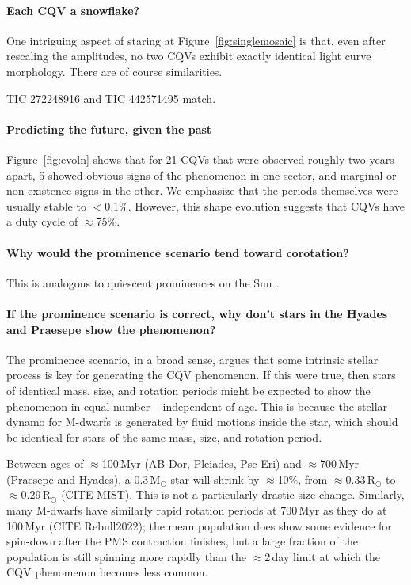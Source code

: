 \documentclass[11pt,twocolumn,tighten]{aastex63}
\begin{document}
\paragraph{Each CQV a snowflake?}
One intriguing aspect of staring at Figure~\ref{fig:singlemosaic}
is that, even after rescaling the amplitudes, no two CQVs
exhibit exactly identical light curve morphology.
There are of course similarities.

TIC 272248916 and TIC 442571495 match.


\paragraph{Predicting the future, given the past}
Figure~\ref{fig:evoln}
shows that for 21 CQVs that were observed roughly two years
apart, 5 showed obvious signs of the phenomenon in one sector,
and marginal or non-existence signs in the other.
We emphasize that the periods themselves were usually stable to $<$0.1\%.
However, this shape evolution
suggests that CQVs have a duty cycle of $\approx$75\%.


\paragraph{Why would the prominence scenario tend toward corotation?}
This is analogous to quiescent
prominences on the Sun \citep{1967SoPh....2...39K}.


\paragraph{If the prominence scenario is correct, why don't stars in the
Hyades and Praesepe show the phenomenon?}

The prominence scenario, in a broad sense, argues that some intrinsic
stellar process is key for generating the CQV phenomenon.
If this were true, then stars of identical mass, size, and rotation
periods might be expected to show the phenomenon in equal number --
independent of age.
This is because the stellar dynamo for M-dwarfs is generated by fluid
motions inside the star, which should be identical for stars of the
same mass, size, and rotation period.

Between ages of $\approx$100\,Myr (AB Dor, Pleiades, Psc-Eri) and
$\approx$700\,Myr (Praesepe and Hyades), a 0.3\,M$_\odot$ star will
shrink by $\approx$10\%, from $\approx$0.33\,R$_\odot$ to 
$\approx$0.29\,R$_\odot$ (CITE MIST).
This is not a particularly drastic size change.
Similarly, many M-dwarfs  have similarly rapid rotation periods 
at 700\,Myr as they do at 100\,Myr (CITE Rebull2022); 
the mean population does show some evidence for spin-down after the
PMS contraction finishes, but a large fraction of the population is
still spinning more rapidly than the $\approx$2\,day limit at which
the CQV phenomenon becomes less common.
\end{document}
